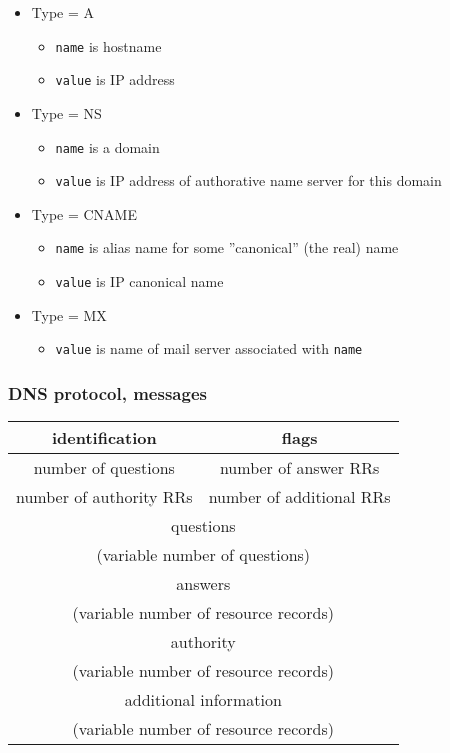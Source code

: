 \documentclass[10pt, a4paper, twocolumn]{scrartcl}
\begin{document}
\begin{itemize}
	\item Type = A
		\begin{itemize}
			\item \verb#name# is hostname
			\item \verb#value# is IP address
		\end{itemize}
	\item Type = NS
		\begin{itemize}
			\item \verb#name# is a domain
			\item \verb#value# is IP address of authorative name server for this domain
		\end{itemize}
	\item Type = CNAME
		\begin{itemize}
			\item \verb#name# is alias name for some ''canonical'' (the real) name
			\item \verb#value# is IP canonical name
		\end{itemize}
	\item Type = MX
		\begin{itemize}
			\item \verb#value# is name of mail server associated with \verb#name#
		\end{itemize}
\end{itemize}

\subsubsection{DNS protocol, messages}

\begin{tabular}{|c|c|}
	\hline
	identification &		flags \\ \hline
	number of questions &		number of answer RRs \\ \hline
	number of authority RRs &	number of additional RRs \\ \hline
	\multicolumn{2}{|c|}{questions} \\ 
	\multicolumn{2}{|c|}{(variable number of questions)} \\ \hline
	\multicolumn{2}{|c|}{answers} \\ 
	\multicolumn{2}{|c|}{(variable number of resource records)} \\ \hline
	\multicolumn{2}{|c|}{authority} \\ 
	\multicolumn{2}{|c|}{(variable number of resource records)} \\ \hline
	\multicolumn{2}{|c|}{additional information} \\ 
	\multicolumn{2}{|c|}{(variable number of resource records)} \\ \hline
\end{tabular}
\end{document}
